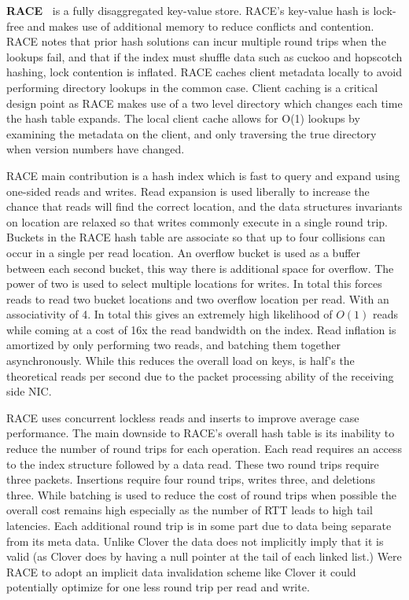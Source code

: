 \textbf{RACE~\cite{one-sided-hash}}
is a fully disaggregated key-value store. RACE's key-value hash is lock-free and
makes use of additional memory to reduce conflicts and contention. RACE notes
that prior hash solutions can incur multiple round trips when the lookups fail,
and that if the index must shuffle data such as cuckoo and hopscotch hashing,
lock contention is inflated. RACE caches client metadata locally to avoid
performing directory lookups in the common case. Client caching is a critical
design point as RACE makes use of a two level directory which changes each time
the hash table expands. The local client cache allows for O(1) lookups by
examining the metadata on the client, and only traversing the true directory
when version numbers have changed.

RACE main contribution is a hash index which is fast to query and expand using
one-sided reads and writes. Read expansion is used liberally to increase the
chance that reads will find the correct location, and the data structures
invariants on location are relaxed so that writes commonly execute in a single
round trip.  Buckets in the RACE hash table are associate so that up to four
collisions can occur in a single per read location. An overflow bucket is used
as a buffer between each second bucket, this way there is additional space for
overflow. The power of two is used to select multiple locations for writes. In
total this forces reads to read two bucket locations and two overflow location
per read.  With an associativity of 4. In total this gives an extremely high
likelihood of $O(1)$ reads while coming at a cost of 16x the read bandwidth on
the index. Read inflation is amortized by only performing two reads, and
batching them together asynchronously. While this reduces the overall load on
keys, is half's the theoretical reads per second due to the packet processing
ability of the receiving side NIC. 

RACE uses concurrent lockless reads and inserts to improve average case
performance. The main downside to RACE's overall hash table is its inability to
reduce the number of round trips for each operation. Each read requires an
access to the index structure followed by a data read. These two round trips
require three packets.  Insertions require four round trips, writes three, and
deletions three. While batching is used to reduce the cost of round trips when
possible the overall cost remains high especially as the number of RTT leads to
high tail latencies. Each additional round trip is in some part due to data
being separate from its meta data. Unlike Clover the data does not implicitly
imply that it is valid (as Clover does by having a null pointer at the tail of
each linked list.) Were RACE to adopt an implicit data invalidation scheme like
Clover it could potentially optimize for one less round trip per read and write.

